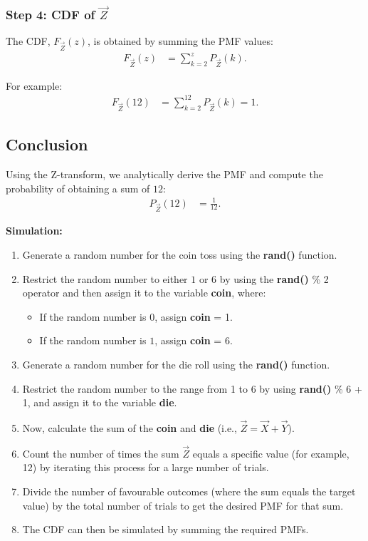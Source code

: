 \documentclass[journal]{IEEEtran}
\begin{document}
\subsubsection*{Step 4: CDF of $\vec{Z}$}
The CDF, $F_{\vec{Z}}(z)$, is obtained by summing the PMF values:
\begin{align}
F_{\vec{Z}}(z) &= \sum_{k=2}^{z} P_{\vec{Z}}(k).
\end{align}

For example:
\begin{align}
F_{\vec{Z}}(12) &= \sum_{k=2}^{12} P_{\vec{Z}}(k) = 1.
\end{align}

\subsection*{Conclusion}
Using the Z-transform, we analytically derive the PMF and compute the probability of obtaining a sum of $12$:
\begin{align}
P_{\vec{Z}}(12) &= \frac{1}{12}.
\end{align}

\textbf{Simulation:} \\
\begin{enumerate}
    \item Generate a random number for the coin toss using the \textbf{rand()} function.
    \item Restrict the random number to either $1$ or $6$ by using the \textbf{rand()} \% 2 operator and then assign it to the variable \textbf{coin}, where:
    \begin{itemize}
        \item If the random number is $0$, assign \textbf{coin} = 1.
        \item If the random number is $1$, assign \textbf{coin} = 6.
    \end{itemize}
    \item Generate a random number for the die roll using the \textbf{rand()} function.
    \item Restrict the random number to the range from 1 to 6 by using \textbf{rand()} \% 6 + 1, and assign it to the variable \textbf{die}.
    \item Now, calculate the sum of the \textbf{coin} and \textbf{die} (i.e., $\vec{Z} = \vec{X} + \vec{Y}$).
    \item Count the number of times the sum $\vec{Z}$ equals a specific value (for example, 12) by iterating this process for a large number of trials.
    \item Divide the number of favourable outcomes (where the sum equals the target value) by the total number of trials to get the desired PMF for that sum.
    \item The CDF can then be simulated by summing the required PMFs.
\end{enumerate}
\end{document}
